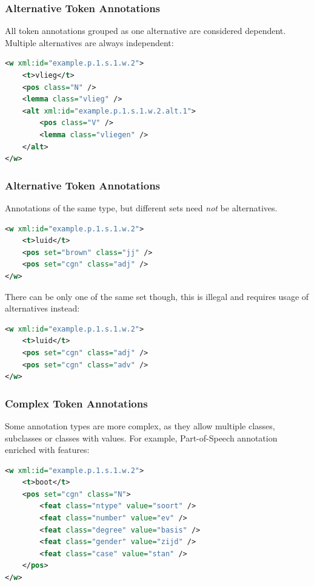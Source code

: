 \documentclass[compress]{beamer}
\begin{document}
\begin{frame}[fragile]
\frametitle{Alternative Token Annotations}

All token annotations grouped as one alternative are considered dependent. Multiple alternatives are always independent:

\begin{lstlisting}[language=xml]
<w xml:id="example.p.1.s.1.w.2">
    <t>vlieg</t>
    <pos class="N" />
    <lemma class="vlieg" />
    <alt xml:id="example.p.1.s.1.w.2.alt.1">
        <pos class="V" />
        <lemma class="vliegen" />
    </alt>
</w>                         
\end{lstlisting}        

\end{frame}


\begin{frame}[fragile]
\frametitle{Alternative Token Annotations}

Annotations of the same type, but different sets need \emph{not} be alternatives.

\begin{lstlisting}[language=xml]
<w xml:id="example.p.1.s.1.w.2">
    <t>luid</t>
    <pos set="brown" class="jj" />
    <pos set="cgn" class="adj" />
</w>                         
\end{lstlisting}        

There can be only one of the same set though, this is illegal and requires usage of alternatives instead:

\begin{lstlisting}[language=xml]
<w xml:id="example.p.1.s.1.w.2">
    <t>luid</t>
    <pos set="cgn" class="adj" />
    <pos set="cgn" class="adv" />
</w>                         
\end{lstlisting}   

\end{frame}
\begin{frame}[fragile]
\frametitle{Complex Token Annotations}

Some annotation types are more complex, as they allow multiple classes, subclasses or classes with values. For example, Part-of-Speech annotation enriched with features:

\begin{lstlisting}[language=xml]
<w xml:id="example.p.1.s.1.w.2">
    <t>boot</t>
    <pos set="cgn" class="N">
        <feat class="ntype" value="soort" />
        <feat class="number" value="ev" />
        <feat class="degree" value="basis" />
        <feat class="gender" value="zijd" />
        <feat class="case" value="stan" />
    </pos>
</w>
\end{lstlisting}    

\end{frame}
\end{document}
